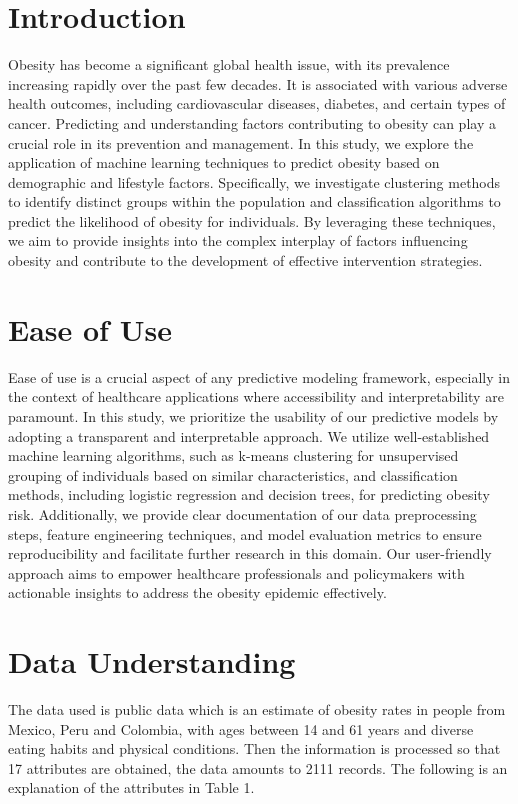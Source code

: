 \documentclass[conference]{IEEEtran}
\begin{document}
\section{Introduction}
Obesity has become a significant global health issue, with its prevalence increasing rapidly over the past few decades. It is associated with various adverse health outcomes, including cardiovascular diseases, diabetes, and certain types of cancer. Predicting and understanding factors contributing to obesity can play a crucial role in its prevention and management. In this study, we explore the application of machine learning techniques to predict obesity based on demographic and lifestyle factors. Specifically, we investigate clustering methods to identify distinct groups within the population and classification algorithms to predict the likelihood of obesity for individuals. By leveraging these techniques, we aim to provide insights into the complex interplay of factors influencing obesity and contribute to the development of effective intervention strategies.
\section{Ease of Use}
Ease of use is a crucial aspect of any predictive modeling framework, especially in the context of healthcare applications where accessibility and interpretability are paramount. In this study, we prioritize the usability of our predictive models by adopting a transparent and interpretable approach. We utilize well-established machine learning algorithms, such as k-means clustering for unsupervised grouping of individuals based on similar characteristics, and classification methods, including logistic regression and decision trees, for predicting obesity risk. Additionally, we provide clear documentation of our data preprocessing steps, feature engineering techniques, and model evaluation metrics to ensure reproducibility and facilitate further research in this domain. Our user-friendly approach aims to empower healthcare professionals and policymakers with actionable insights to address the obesity epidemic effectively.



\section{Data Understanding}
The data used is public data which is an estimate of obesity rates in people from Mexico, Peru and Colombia, with ages between 14 and 61 years and diverse eating habits and physical conditions. Then the information is processed so that 17 attributes are obtained, the data amounts to 2111 records. The following is an explanation of the attributes in Table 1.
\end{document}
